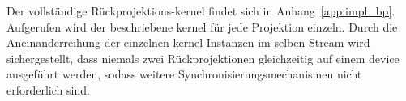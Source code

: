 Der vollständige Rückprojektions-\gls{kernel} findet sich in Anhang~\ref{app:impl_bp}. Aufgerufen wird der beschriebene
\gls{kernel} für jede Projektion einzeln. Durch die Aneinanderreihung der einzelnen \gls{kernel}-Instanzen im selben
Stream wird sichergestellt, dass niemals zwei Rückprojektionen gleichzeitig auf einem \gls{device} ausgeführt werden,
sodass weitere Synchronisierungsmechanismen nicht erforderlich sind.
